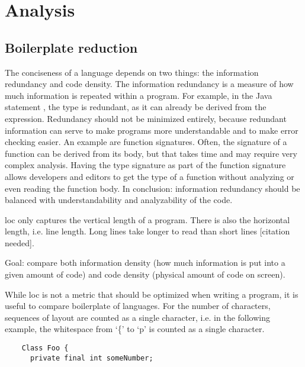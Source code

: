 
\section{Analysis}
\label{sec:evaluation__analysis}


\subsection{Boilerplate reduction}
\label{subsec:evaluation__analysis__boilerplate_reduction}

The conciseness of a language depends on two things: the information redundancy and code density.
The information redundancy is a measure of how much information is repeated within a program.
For example, in the Java statement , the type  is redundant, as it can already be derived from the expression.
Redundancy should not be minimized entirely, because redundant information can serve to make programs more understandable and to make error checking easier.
An example are function signatures.
Often, the signature of a function can be derived from its body, but that takes time and may require very complex analysis.
Having the type signature as part of the function signature allows developers and editors to get the type of a function without analyzing or even reading the function body.
In conclusion: information redundancy should be balanced with understandability and analyzability of the code.

\Ac{loc} only captures the vertical length of a program.
There is also the horizontal length, i.e. line length.
Long lines take longer to read than short lines [citation needed].


Goal: compare both information density (how much information is put into a given amount of code) and code density (physical amount of code on screen).

While \ac{loc} is not a metric that should be optimized when writing a program, it is useful to compare boilerplate of languages.
For the number of characters, sequences of layout are counted as a single character, i.e. in the following example, the whitespace from `\{' to `p' is counted as a single character.
\begin{lstlisting}
    Class Foo {
      private final int someNumber;
\end{lstlisting}


